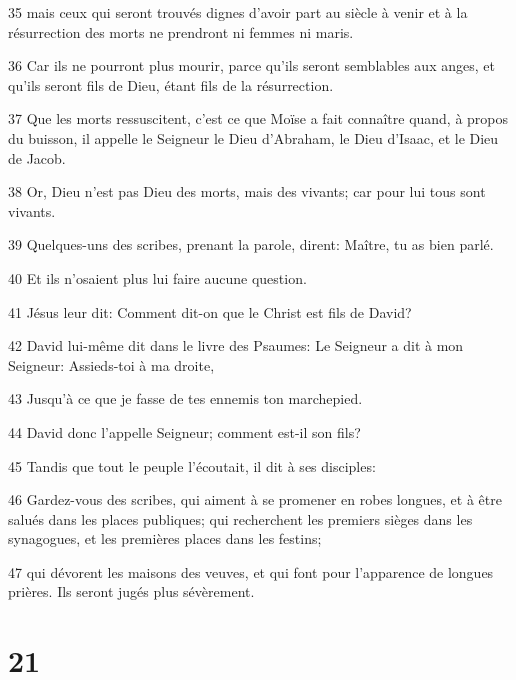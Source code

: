 \par 35 mais ceux qui seront trouvés dignes d'avoir part au siècle à venir et à la résurrection des morts ne prendront ni femmes ni maris.
\par 36 Car ils ne pourront plus mourir, parce qu'ils seront semblables aux anges, et qu'ils seront fils de Dieu, étant fils de la résurrection.
\par 37 Que les morts ressuscitent, c'est ce que Moïse a fait connaître quand, à propos du buisson, il appelle le Seigneur le Dieu d'Abraham, le Dieu d'Isaac, et le Dieu de Jacob.
\par 38 Or, Dieu n'est pas Dieu des morts, mais des vivants; car pour lui tous sont vivants.
\par 39 Quelques-uns des scribes, prenant la parole, dirent: Maître, tu as bien parlé.
\par 40 Et ils n'osaient plus lui faire aucune question.
\par 41 Jésus leur dit: Comment dit-on que le Christ est fils de David?
\par 42 David lui-même dit dans le livre des Psaumes: Le Seigneur a dit à mon Seigneur: Assieds-toi à ma droite,
\par 43 Jusqu'à ce que je fasse de tes ennemis ton marchepied.
\par 44 David donc l'appelle Seigneur; comment est-il son fils?
\par 45 Tandis que tout le peuple l'écoutait, il dit à ses disciples:
\par 46 Gardez-vous des scribes, qui aiment à se promener en robes longues, et à être salués dans les places publiques; qui recherchent les premiers sièges dans les synagogues, et les premières places dans les festins;
\par 47 qui dévorent les maisons des veuves, et qui font pour l'apparence de longues prières. Ils seront jugés plus sévèrement.

\chapter{21}

